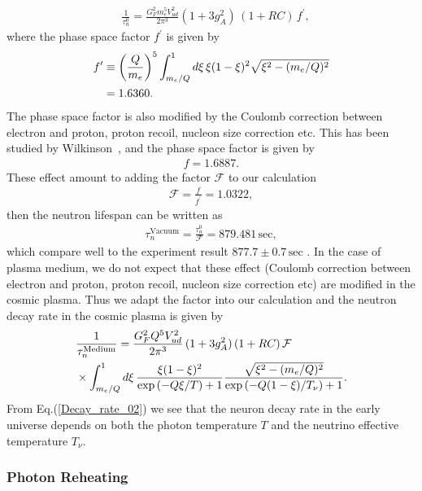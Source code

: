 \begin{align}
&\frac{1}{\tau_n^0}=\frac{G^2_Fm_e^5V^2_{ud}}{2\pi^3}(1+3g^2_A)\,(1+RC)\,f^\prime,
\end{align}
where the phase space factor $f^\prime$ is given by
\begin{align}
f^\prime&\equiv\left(\frac{Q}{m_e}\right)^5\int^1_{m_e/Q}d\xi\,{\xi(1-\xi)^2}\sqrt{\xi^2-(m_e/Q)^2}
\notag\\&=1.6360.
\end{align}
The phase space factor is also modified by the Coulomb correction between electron and proton, proton recoil, nucleon size correction etc. This has been studied by Wilkinson~\cite{Wilkinson:1982hu}, and the phase space factor is given by~\cite{Czarnecki:2018okw,Czarnecki:2004cw,Wilkinson:1982hu}
\begin{align}
f=1.6887.
\end{align}
These effect amount to adding the factor $\mathcal{F}$ to our calculation
\begin{align}
\mathcal{F}=\frac{f}{f^\prime}=1.0322,
\end{align}
then the neutron lifespan can be written as 
\begin{align}
\tau^{\mathrm{Vacuum}}_n=\frac{\tau^0_n}{\mathcal{F}}=879.481\,\mathrm{sec},
\end{align}
which compare well to the experiment result $877.7\pm0.7\,\mathrm{sec}$ \cite{Pattie:2017vsj}. In the case of plasma medium, we do not expect that these effect (Coulomb correction between electron and proton, proton recoil, nucleon size correction etc) are modified in the cosmic plasma. Thus we adapt the factor into our calculation and the neutron decay rate in the cosmic plasma is given by
\begin{align}
\label{Decay_rate_02}
&\frac{1}{\tau_n^{\mathrm{Medium}}}=\frac{G^2_FQ^5V^2_{ud}}{2\pi^3}\,(1+3g^2_A)\,(1+RC)\,\mathcal{F}\\
&\times\int^1_{m_e/Q}d\xi\,\frac{\xi(1-\xi)^2}{\exp\left(-Q\xi/{T}\right)+1}\frac{\sqrt{\xi^2-(m_e/Q)^2}}{\exp\left(-Q(1-\xi)/T_\nu\right)+1}.\notag
\end{align}
From Eq.(\ref{Decay_rate_02}) we see that the neuron decay rate in the early universe depends on both the photon temperature $T$ and the neutrino effective temperature $T_\nu$.


\subsubsection{Photon Reheating}\label{Reheating}

